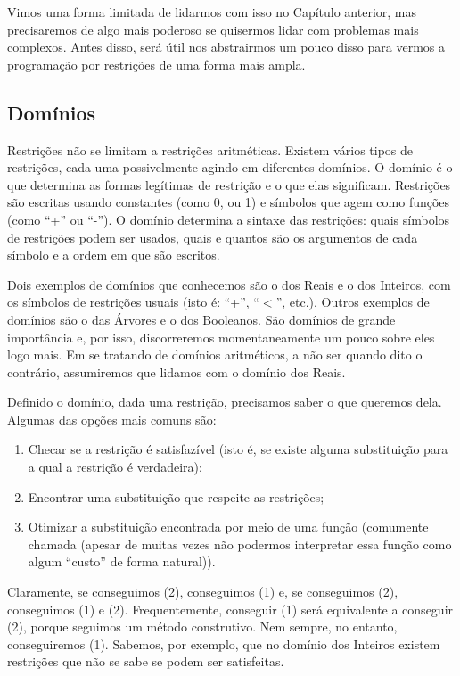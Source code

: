 Vimos uma forma limitada de lidarmos com isso no Capítulo anterior,
mas precisaremos de algo mais poderoso se quisermos lidar com
problemas mais complexos. Antes disso, 
será útil nos abstrairmos um pouco disso para vermos a programação por
restrições de uma forma mais ampla.

\subsection{Domínios}

Restrições não se limitam a restrições aritméticas. Existem vários
tipos de restrições, cada uma possivelmente agindo em diferentes
domínios.  O domínio é o que determina as formas legítimas de
restrição e o que elas significam. Restrições são escritas usando
constantes (como 0, ou 1) e símbolos que agem como funções (como ``+''
ou ``-''). O domínio determina a sintaxe das restrições: quais
símbolos de restrições podem ser usados, quais e quantos são os
argumentos de cada símbolo e a ordem em que são escritos.

Dois exemplos de domínios que conhecemos são o dos Reais e o dos
Inteiros, com os símbolos de restrições usuais (isto é: ``+'',
``$<$'', etc.). Outros exemplos de domínios são o das Árvores e o dos
Booleanos. São domínios de grande importância e, por isso,
discorreremos momentaneamente um pouco sobre eles logo mais. Em se
tratando de domínios aritméticos, a não ser quando dito o contrário,
assumiremos que lidamos com o domínio dos Reais.

Definido o domínio, dada uma restrição, precisamos saber o que
queremos dela. Algumas das opções mais comuns são:
\begin{enumerate}
\item Checar se a restrição é satisfazível (isto é, se existe
  alguma substituição para a qual a restrição é verdadeira);
\item Encontrar uma substituição que respeite as restrições;
\item Otimizar a substituição encontrada por meio de uma função
  (comumente chamada  (apesar de muitas
  vezes não podermos interpretar essa função como algum ``custo''
  de forma natural)).
\end{enumerate}

Claramente, se conseguimos (2), conseguimos (1) e, se conseguimos
(2), conseguimos (1) e (2). Frequentemente, conseguir (1) será
equivalente a conseguir (2), porque seguimos um método
construtivo. Nem sempre, no entanto, conseguiremos (1). Sabemos, por
exemplo, que no domínio dos Inteiros existem restrições que não se
sabe se podem ser satisfeitas.

